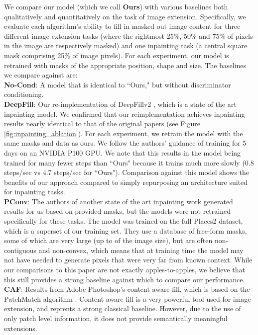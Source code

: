 We compare our model (which we call \textbf{Ours}) with various baselines both qualitatively and quantitatively on the task of image extension. Specifically, we evaluate each algorithm's ability to fill in masked out image content for three different image extension tasks (where the rightmost 25\%, 50\% and 75\% of pixels in the image are respectively masked) and one inpainting task (a central square mask comprising 25\% of image pixels). For each experiment, our model is retrained with masks of the appropriate position, shape and size. The baselines we compare against are:\\
    \noindent\textbf{No-Cond}: A model that is identical to ``Ours," but without discriminator conditioning.\\
    \noindent\textbf{DeepFill}: Our re-implementation of  DeepFillv2 \cite{yu2018free}, which is a state of the art inpainting model. We confirmed that our reimplementation achieves inpainting results nearly identical to that of the original papers (see Figure \ref{fig:inpainting_ablation}). For each experiment, we retrain the model with the same masks and data as ours. We follow the authors' guidance of training for 5 days on an NVIDIA P100 GPU. We note that this results in the model being trained for many fewer steps than ``Ours" because it trains much more slowly (0.8 steps/sec vs 4.7 steps/sec for ``Ours"). Comparison against this model shows the benefits of our approach compared to simply repurposing an architecture suited for inpainting tasks.\\
    \noindent\textbf{PConv}: The authors of another state of the art inpainting work \cite{liu2018partialinpainting} generated results for us based on provided masks, but the models were not retrained specifically for these tasks. The model was trained on the full Places2 dataset, which is a superset of our training set. They use a database of free-form masks, some of which are very large (up to  of the image size), but are often non-contiguous and non-convex, which means that at training time the model may not have needed to generate pixels that were very far from known context. While our comparisons to this paper are not exactly apples-to-apples, we believe that this still provides a strong baseline against which to compare our performance.\\
    \noindent\textbf{CAF}: Results from Adobe Photoshop's content aware fill, which is based on the PatchMatch  algorithm \cite{barnes2009patchmatch}. Content aware fill is a very powerful tool used for image extension, and reprents a strong classical baseline. However, due to the use of only patch level information, it does not provide semantically meaningful extensions.\\   
    
